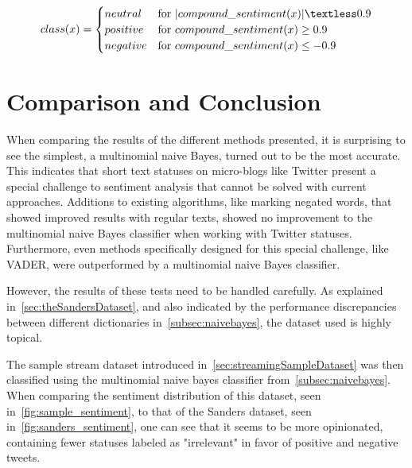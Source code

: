 \begin{equation}
    class(x) =
    \begin{cases}
        neutral & \text{for } |compound\_sentiment(x)| \textless 0.9 \\
        positive & \text{for } compound\_sentiment(x) \geq 0.9 \\
        negative & \text{for } compound\_sentiment(x) \leq -0.9 \\
    \end{cases}
\end{equation}

\section{Comparison and Conclusion}
\label{sec:comparison}

When comparing the results of the different methods presented, it is surprising to see the simplest,
a multinomial naive Bayes, turned out to be the most accurate.\\
This indicates that short text statuses on micro-blogs like Twitter present a special challenge to sentiment analysis
that cannot be solved with current approaches.
Additions to existing algorithms, like marking negated words, that showed improved results with regular texts,
showed no improvement to the multinomial naive Bayes classifier when working with Twitter statuses.
Furthermore, even methods specifically designed for this special challenge, like VADER,
were outperformed by a multinomial naive Bayes classifier.
\par
However, the results of these tests need to be handled carefully.
As explained in~\ref{sec:theSandersDataset},
and also indicated by the performance discrepancies between different dictionaries in~\ref{subsec:naivebayes},
the dataset used is highly topical.
\par
The sample stream dataset introduced in~\ref{sec:streamingSampleDataset} was then classified using the multinomial naive bayes classifier from~\ref{subsec:naivebayes}.
When comparing the sentiment distribution of this dataset, seen in~\ref{fig:sample_sentiment},
to that of the Sanders dataset, seen in~\ref{fig:sanders_sentiment},
one can see that it seems to be more opinionated,
containing fewer statuses labeled as "irrelevant" in favor of positive and negative tweets.

